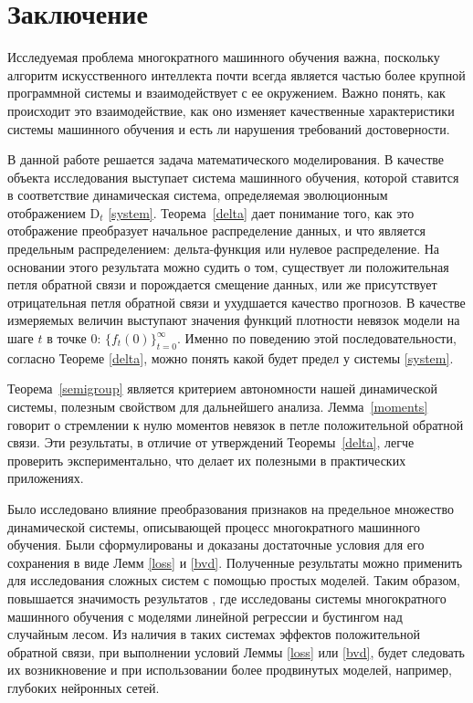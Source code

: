 \section{Заключение}

Исследуемая проблема многократного машинного обучения важна, поскольку алгоритм искусственного интеллекта почти всегда является частью более крупной программной системы и взаимодействует с ее окружением. Важно понять, как происходит это взаимодействие, как оно изменяет качественные характеристики системы машинного обучения и есть ли нарушения требований достоверности.

В данной работе решается задача математического моделирования. В качестве объекта исследования выступает система машинного обучения, которой ставится в соответствие динамическая система, определяемая эволюционным отображением $\text{D}_t$ \eqref{system}. Теорема~\ref{delta} дает понимание того, как это отображение преобразует начальное распределение данных, и что является предельным распределением: дельта-функция или нулевое распределение. На основании этого результата можно судить о том, существует ли положительная петля обратной связи и порождается смещение данных, или же присутствует отрицательная петля обратной связи и ухудшается качество прогнозов. В качестве измеряемых величин выступают значения функций плотности невязок модели на шаге $t$ в точке $0$: $\{f_t(0)\}_{t = 0}^\infty$. Именно по поведению этой последовательности, согласно Теореме \ref{delta}, можно понять какой будет предел у системы \eqref{system}.

Теорема~\ref{semigroup} является критерием автономности нашей динамической системы, полезным свойством для дальнейшего анализа. Лемма~\ref{moments} говорит о стремлении к нулю моментов невязок в петле положительной обратной связи. Эти результаты, в отличие от утверждений Теоремы~\ref{delta}, легче проверить экспериментально, что делает их полезными в практических приложениях.

Было исследовано влияние преобразования признаков на предельное множество динамической системы, описывающей процесс многократного машинного обучения. Были сформулированы и доказаны достаточные условия для его сохранения в виде Лемм \ref{loss} и \ref{bvd}. Полученные результаты можно применить для исследования сложных систем с помощью простых моделей. Таким образом, повышается значимость результатов \cite{veprikov2024mathematical, veprikov2023matematicheskaya, khritankov2021hidden}, где исследованы системы многократного машинного обучения с моделями линейной регрессии и бустингом над случайным лесом. Из наличия в таких системах эффектов положительной обратной связи, при выполнении условий Леммы \ref{loss} или \ref{bvd}, будет следовать их возникновение и при использовании более продвинутых моделей, например, глубоких нейронных сетей.

